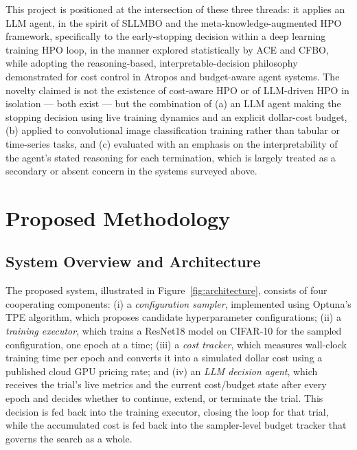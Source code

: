 \documentclass[11pt]{article}
\begin{document}
This project is positioned at the intersection of these three threads: it applies an LLM agent, in the spirit of SLLMBO and the meta-knowledge-augmented HPO framework, specifically to the early-stopping decision within a deep learning training HPO loop, in the manner explored statistically by ACE and CFBO, while adopting the reasoning-based, interpretable-decision philosophy demonstrated for cost control in Atropos and budget-aware agent systems. The novelty claimed is not the existence of cost-aware HPO or of LLM-driven HPO in isolation --- both exist --- but the combination of (a) an LLM agent making the stopping decision using live training dynamics and an explicit dollar-cost budget, (b) applied to convolutional image classification training rather than tabular or time-series tasks, and (c) evaluated with an emphasis on the interpretability of the agent's stated reasoning for each termination, which is largely treated as a secondary or absent concern in the systems surveyed above.

\section{Proposed Methodology}
\label{sec:methodology}

\subsection{System Overview and Architecture}

The proposed system, illustrated in Figure~\ref{fig:architecture}, consists of four cooperating components: (i) a \emph{configuration sampler}, implemented using Optuna's TPE algorithm, which proposes candidate hyperparameter configurations; (ii) a \emph{training executor}, which trains a ResNet18 model on CIFAR-10 for the sampled configuration, one epoch at a time; (iii) a \emph{cost tracker}, which measures wall-clock training time per epoch and converts it into a simulated dollar cost using a published cloud GPU pricing rate; and (iv) an \emph{LLM decision agent}, which receives the trial's live metrics and the current cost/budget state after every epoch and decides whether to continue, extend, or terminate the trial. This decision is fed back into the training executor, closing the loop for that trial, while the accumulated cost is fed back into the sampler-level budget tracker that governs the search as a whole.
\end{document}
